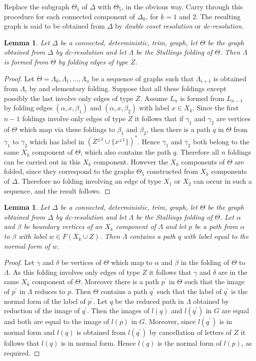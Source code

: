 \documentclass[a4paper,12pt]{article}
\renewcommand{\a}{\alpha }
\renewcommand{\b}{\beta }
\newcommand{\g}{\gamma }
\newcommand{\D}{\Delta }
\renewcommand{\d}{\delta }
\newcommand{\T}{\Theta }
\renewcommand{\L}{\Lambda }
\newtheorem{lemma}[theorem]{Lemma}
\numberwithin{equation}{section}
\numberwithin{figure}{section}
\begin{document}
Replace the subgraph $\T_1$ of $\D$ with $\T_5$, in the obvious
way. Carry through this procedure for each connected component of
$\D_k$, for $k=1$ and $2$. The resulting graph is said to be
obtained from $\D$ by {\em double coset resolution} or {\em dc-resolution}.


\begin{lemma}
Let $\D$ be  a connected, deterministic, trim, graph, let $\T$ be
the graph
obtained from $\D$ by dc-resolution %
and let
$\L$ be the Stallings folding of $\T$. Then $\L$ is formed from
$\T$ by folding edges of type $Z$.
\end{lemma}
\begin{proof}
Let $\T=\L_0,\L_1,\ldots, \L_n$ be a sequence of graphs such that
$\L_{i+1}$ is obtained from $\L_i$ by and elementary folding.
Suppose that all these foldings except possibly the last involve only edges
of type $Z$. Assume $L_n$ is formed from $L_{n-1}$ by folding edges
$(\a,x,\b_1)$ and $(\a,x,\b_2)$ with label $x\in X_k$. Since the
first $n-1$ foldings involve only edges of type $Z$ it follows that
if $\g_1$ and $\g_2$ are vertices of $\T$ which map via these foldings
to $\b_1$ and $\b_2$, then there is a path $q$ in $\T$ from $\g_1$ to $\g_2$
which has label in $(Z^{\pm 1}\cup \{x^{\pm 1}\})^\ast$. Hence $\g_1$ and $\g_2$ both belong to
 the same $X_k$ component of $\T$, which also contains the path $q$.
Therefore all $n$ foldings can be carried out in this $X_k$
component. However the $X_k$ components of $\T$ are folded, since they
correspond to the graphs $\T_5$ constructed from $X_k$ components of $\D$.
Therefore no folding involving an edge of type $X_1$ or $X_2$ can occur
in such a sequence, and the result follows.
\end{proof}
\begin{lemma}
Let $\D$ be  a connected, deterministic, trim, graph, let $\T$ be
the graph
obtained from $\D$ by dc-resolution %
and let
$\L$ be the Stallings folding of $\T$. Let $\a$  and $\b$ be boundary
vertices of an $X_k$ component of $\L$ and let $p$ be a path from
$\a$ to $\b$ with label $w\in F(X_k\cup Z)$. Then $\L$ contains a
path $q$ with label equal to the normal form of $w$.
\end{lemma}
\begin{proof}
Let $\g$ and $\d$ be vertices of $\T$ which map to $\a$ and $\b$ in the
folding of $\T$ to $\L$. As this folding involves only edges of type $Z$
it follows that $\g$ and $\d$ are in the same $X_k$ component of $\T$.
Moreover there is a path $p^\prime$ in $\T$ such that the image
of $p^\prime$ in $\L$ reduces to $p$. Then $\T$ contains a path
$q^\prime$ such that the label of $q^\prime$ is the normal form of
the label of $p^\prime$. Let $q$ be the reduced path in $\L$ obtained by
reduction of the image of $q^\prime$. Then the images of $l(q)$ and
$l(q^\prime)$ in $G$ are equal and both are equal to the image of $l(p)$ in
$G$. Moreover, since $l(q^\prime)$ is in normal form and $l(q)$ is obtained
from $l(q^\prime)$ by cancellation of letters of $Z$ it follows that
$l(q)$ is in normal form. Hence $l(q)$ is the normal form of $l(p)$,
as required.
\end{proof}
\end{document}
